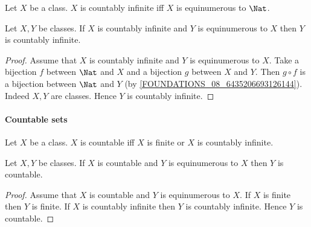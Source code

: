 \documentclass[../arithmetic.tex]{subfiles}
\begin{document}
  \begin{forthel}
    \begin{definition}
      Let $X$ be a class.
      $X$ is countably infinite iff $X$ is equinumerous to $\Nat$.
    \end{definition}
  \end{forthel}

  \begin{forthel}
    \begin{proposition}
      Let $X, Y$ be classes.
      If $X$ is countably infinite and $Y$ is equinumerous to $X$ then $Y$ is
      countably infinite.
    \end{proposition}
    \begin{proof}
      Assume that $X$ is countably infinite and $Y$ is equinumerous to $X$.
      Take a bijection $f$ between $\Nat$ and $X$ and a bijection $g$ between
      $X$ and $Y$.
      Then $g \circ f$ is a bijection between $\Nat$ and $Y$
      (by \cref{FOUNDATIONS_08_6435206693126144}).
      Indeed $X, Y$ are classes.
      Hence $Y$ is countably infinite.
    \end{proof}
  \end{forthel}


  \paragraph{Countable sets}

  \begin{forthel}
    \begin{definition}
      Let $X$ be a class.
      $X$ is countable iff $X$ is finite or $X$ is countably infinite.
    \end{definition}
  \end{forthel}

  \begin{forthel}
    \begin{proposition}
      Let $X, Y$ be classes.
      If $X$ is countable and $Y$ is equinumerous to $X$ then $Y$ is countable.
    \end{proposition}
    \begin{proof}
      Assume that $X$ is countable and $Y$ is equinumerous to $X$.
      If $X$ is finite then $Y$ is finite.
      If $X$ is countably infinite then $Y$ is countably infinite.
      Hence $Y$ is countable.
    \end{proof}
  \end{forthel}
\end{document}
